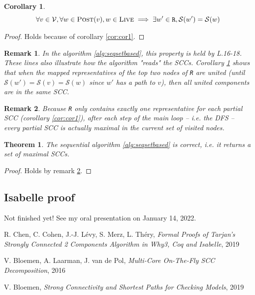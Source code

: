 \documentclass[a4 paper, 12pt]{article}
\newtheorem{theorem}{Theorem}
\newtheorem{corollary}{Corollary}[lemma]
\newtheorem{remark}{Remark}
\begin{document}
\begin{corollary}\label{cor:cor2}
    \begin{equation*}
        \forall v \in \mathcal{V}, \forall w \in \textsc{Post}(v), w \in \textsc{Live} \implies \exists w' \in \texttt{R}, \mathcal{S}(w') = \mathcal{S}(w)
    \end{equation*}
\end{corollary}

\begin{proof}
    Holds because of corollary \ref{cor:cor1}.
\end{proof}

\begin{remark}
    In the algorithm \ref{alg:seqsetbased}, this property is held by L.16-18. These lines also illustrate how the algorithm "reads" the SCCs. Corollary \ref{cor:cor2} shows that when the mapped representatives of the top two nodes of \texttt{R} are united (until $\mathcal{S}(w') = \mathcal{S}(v) = \mathcal{S}(w)$ since $w'$ has a path to $v$), then all united components are in the same SCC.
\end{remark}

\begin{remark}\label{rem:proof}
    Because \texttt{R} only contains exactly one representative for each partial SCC (corollary \ref{cor:cor1}), after each step of the main loop -- \textit{i.e.} the DFS -- every partial SCC is actually maximal in the current set of visited nodes.
\end{remark}

\begin{theorem}
    The sequential algorithm \ref{alg:seqsetbased} is correct, \textit{i.e.} it returns a set of maximal SCCs.
\end{theorem}
\begin{proof}
    Holds by remark \ref{rem:proof}.
\end{proof}

\pagebreak

\subsection{Isabelle proof}
Not finished yet! See my oral presentation on January 14, 2022.
\pagebreak

\begin{thebibliography}{99}

 R. Chen, C. Cohen, J.-J. Lévy, S. Merz, L. Théry, \emph{Formal Proofs of Tarjan’s Strongly Connected 2 Components Algorithm in Why3, Coq and Isabelle}, 2019

 V. Bloemen, A. Laarman, J. van de Pol, \emph{Multi-Core On-The-Fly SCC Decomposition}, 2016

 V. Bloemen, \emph{Strong Connectivity and Shortest Paths for Checking Models}, 2019

\end{thebibliography}
\end{document}
